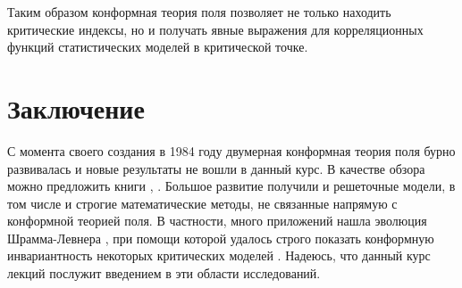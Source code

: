 \documentclass[a4paper,12pt]{article}
\theoremstyle{definition}
\theoremstyle{definition}
\theoremstyle{definition}
\begin{document}
Таким образом конформная теория поля позволяет не только находить критические индексы, но и получать явные выражения для корреляционных функций статистических моделей в критической точке. 

\section{Заключение}
\label{sec:conclusion}

С момента своего создания в 1984 году двумерная конформная теория поля бурно развивалась и новые результаты не вошли в данный курс. В качестве обзора можно предложить книги \cite{difrancesco1997cft}, \cite{schottenloher2008mathematical}. Большое развитие получили и решеточные модели, в том числе и строгие математические методы, не связанные напрямую с конформной теорией поля. В частности, много приложений нашла эволюция Шрамма-Левнера \cite{schramm2000scaling}, при помощи которой удалось строго показать конформную инвариантность некоторых критических моделей \cite{chelkak2009universality,smirnov2001critical}. Надеюсь, что данный курс лекций послужит введением в эти области исследований. 

{}

\end{document}
